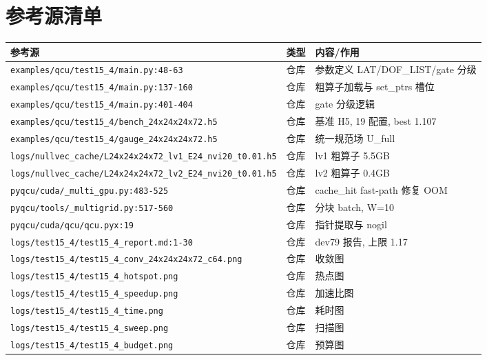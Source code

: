 \documentclass[UTF8]{ctexart}
\begin{document}
\section{参考源清单}
\begin{xltabular}{\textwidth}{llX}
\toprule
\textcolor{evidence}{参考源} & 类型 & 内容/作用 \\
\midrule
\endhead
\texttt{\nolinkurl{examples/qcu/test15_4/main.py:48-63}} & 仓库 & 参数定义 LAT/DOF\_LIST/gate 分级 \\
\texttt{\nolinkurl{examples/qcu/test15_4/main.py:137-160}} & 仓库 & 粗算子加载与 set\_ptrs 槽位 \\
\texttt{\nolinkurl{examples/qcu/test15_4/main.py:401-404}} & 仓库 & gate 分级逻辑 \\
\texttt{\nolinkurl{examples/qcu/test15_4/bench_24x24x24x72.h5}} & 仓库 & 基准 H5, 19 配置, best 1.107 \\
\texttt{\nolinkurl{examples/qcu/test15_4/gauge_24x24x24x72.h5}} & 仓库 & 统一规范场 U\_full \\
\texttt{\nolinkurl{logs/nullvec_cache/L24x24x24x72_lv1_E24_nvi20_t0.01.h5}} & 仓库 & lv1 粗算子 5.5GB \\
\texttt{\nolinkurl{logs/nullvec_cache/L24x24x24x72_lv2_E24_nvi20_t0.01.h5}} & 仓库 & lv2 粗算子 0.4GB \\
\texttt{\nolinkurl{pyqcu/cuda/_multi_gpu.py:483-525}} & 仓库 & cache\_hit fast-path 修复 OOM \\
\texttt{\nolinkurl{pyqcu/tools/_multigrid.py:517-560}} & 仓库 & 分块 batch, W=10 \\
\texttt{\nolinkurl{pyqcu/cuda/qcu/qcu.pyx:19}} & 仓库 & 指针提取与 nogil \\
\texttt{\nolinkurl{logs/test15_4/test15_4_report.md:1-30}} & 仓库 & dev79 报告, 上限 1.17 \\
\texttt{\nolinkurl{logs/test15_4/test15_4_conv_24x24x24x72_c64.png}} & 仓库 & 收敛图 \\
\texttt{\nolinkurl{logs/test15_4/test15_4_hotspot.png}} & 仓库 & 热点图 \\
\texttt{\nolinkurl{logs/test15_4/test15_4_speedup.png}} & 仓库 & 加速比图 \\
\texttt{\nolinkurl{logs/test15_4/test15_4_time.png}} & 仓库 & 耗时图 \\
\texttt{\nolinkurl{logs/test15_4/test15_4_sweep.png}} & 仓库 & 扫描图 \\
\texttt{\nolinkurl{logs/test15_4/test15_4_budget.png}} & 仓库 & 预算图 \\

\end{xltabular}
\end{document}
